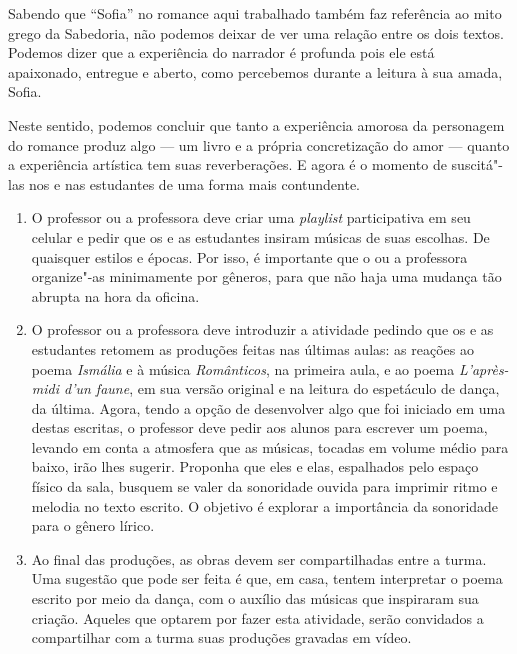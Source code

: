\documentclass[12pt]{extarticle}
\begin{document}
Sabendo que ``Sofia'' no romance aqui trabalhado também faz referência 
ao mito grego da Sabedoria, não podemos deixar de ver uma relação
entre os dois textos. Podemos dizer que a experiência do narrador
é profunda pois ele está apaixonado, entregue e aberto, como percebemos
durante a leitura à sua amada, Sofia. 

Neste sentido, podemos concluir que tanto a experiência amorosa da personagem
do romance produz algo --- um livro e a própria concretização do amor ---
quanto a experiência artística tem suas reverberações. E agora é o momento de 
suscitá"-las nos e nas estudantes de uma forma mais contundente.


\begin{enumerate}
\paragraph{Metodologia}

  \item
  O professor ou a professora deve criar uma \textit{playlist} participativa em seu celular
  e pedir que os e as estudantes insiram músicas de suas escolhas. De quaisquer
  estilos e épocas. Por isso, é importante que o ou a professora 
  organize"-as minimamente por gêneros, para que não haja uma mudança tão abrupta
  na hora da oficina. 

  \item
  O professor ou a professora deve introduzir a atividade pedindo que os e as estudantes
  retomem as produções feitas nas últimas aulas: as reações ao poema \textit{Ismália}
  e à música \textit{Românticos}, na primeira aula, e ao poema \textit{L'après-midi d'un faune},
  em sua versão original e na leitura do espetáculo de dança, da última. Agora,
  tendo a opção de desenvolver algo que foi iniciado em uma destas escritas,
  o professor deve pedir aos alunos para escrever um poema, levando em conta a
  atmosfera que as músicas, tocadas em volume médio para baixo, irão lhes sugerir. 
  Proponha que eles e elas, espalhados pelo espaço físico da sala, 
  busquem se valer da sonoridade ouvida para imprimir ritmo e
  melodia no texto escrito. O objetivo é explorar a importância da sonoridade
  para o gênero lírico.

  \item
  Ao final das produções, as obras devem ser compartilhadas entre a turma. 
  Uma sugestão que pode ser feita é que, em casa, tentem interpretar o poema
  escrito por meio da dança, com o auxílio das músicas que inspiraram sua criação.
  Aqueles que optarem por fazer esta atividade, serão convidados a compartilhar 
  com a turma suas produções gravadas em vídeo.
\end{enumerate}
\end{document}
